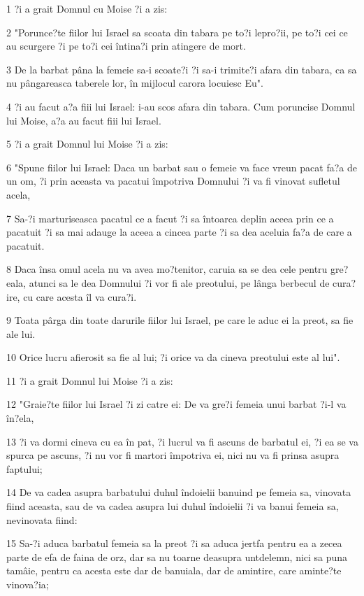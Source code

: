 \par 1 ?i a grait Domnul cu Moise ?i a zis:
\par 2 "Porunce?te fiilor lui Israel sa scoata din tabara pe to?i lepro?ii, pe to?i cei ce au scurgere ?i pe to?i cei întina?i prin atingere de mort.
\par 3 De la barbat pâna la femeie sa-i scoate?i ?i sa-i trimite?i afara din tabara, ca sa nu pângareasca taberele lor, în mijlocul carora locuiesc Eu".
\par 4 ?i au facut a?a fiii lui Israel: i-au scos afara din tabara. Cum poruncise Domnul lui Moise, a?a au facut fiii lui Israel.
\par 5 ?i a grait Domnul lui Moise ?i a zis:
\par 6 "Spune fiilor lui Israel: Daca un barbat sau o femeie va face vreun pacat fa?a de un om, ?i prin aceasta va pacatui împotriva Domnului ?i va fi vinovat sufletul acela,
\par 7 Sa-?i marturiseasca pacatul ce a facut ?i sa întoarca deplin aceea prin ce a pacatuit ?i sa mai adauge la aceea a cincea parte ?i sa dea aceluia fa?a de care a pacatuit.
\par 8 Daca însa omul acela nu va avea mo?tenitor, caruia sa se dea cele pentru gre?eala, atunci sa le dea Domnului ?i vor fi ale preotului, pe lânga berbecul de cura?ire, cu care acesta îl va cura?i.
\par 9 Toata pârga din toate darurile fiilor lui Israel, pe care le aduc ei la preot, sa fie ale lui.
\par 10 Orice lucru afierosit sa fie al lui; ?i orice va da cineva preotului este al lui".
\par 11 ?i a grait Domnul lui Moise ?i a zis:
\par 12 "Graie?te fiilor lui Israel ?i zi catre ei: De va gre?i femeia unui barbat ?i-l va în?ela,
\par 13 ?i va dormi cineva cu ea în pat, ?i lucrul va fi ascuns de barbatul ei, ?i ea se va spurca pe ascuns, ?i nu vor fi martori împotriva ei, nici nu va fi prinsa asupra faptului;
\par 14 De va cadea asupra barbatului duhul îndoielii banuind pe femeia sa, vinovata fiind aceasta, sau de va cadea asupra lui duhul îndoielii ?i va banui femeia sa, nevinovata fiind:
\par 15 Sa-?i aduca barbatul femeia sa la preot ?i sa aduca jertfa pentru ea a zecea parte de efa de faina de orz, dar sa nu toarne deasupra untdelemn, nici sa puna tamâie, pentru ca acesta este dar de banuiala, dar de amintire, care aminte?te vinova?ia;
